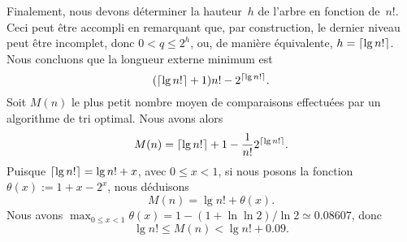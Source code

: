 Finalement, nous devons déterminer la hauteur~\(h\) de l'arbre en
fonction de~\(n!\). Ceci peut être accompli en remarquant que, par
construction, le dernier niveau peut être incomplet, donc \(0 < q
\leqslant 2^h\), ou, de manière équivalente, \(h = \lceil{\lg
  n!}\rceil\). Nous concluons que la longueur externe minimum est
\begin{equation*}
(\lceil{\lg n!}\rceil + 1) n! - 2^{\lceil{\lg n!}\rceil}.
\end{equation*}
Soit \(M(n)\) \label{def_Mn} le plus petit nombre moyen de
comparaisons effectuées par un algorithme de tri optimal. Nous avons
alors
\begin{equation*}
M(n) = \lceil{\lg n!}\rceil + 1 - \frac{1}{n!}2^{\lceil{\lg n!}\rceil}.
\end{equation*}
Puisque \(\lceil{\lg n!}\rceil = \lg n! + x\), avec \(0 \leqslant x < 1\),
si nous posons la fonction \(\theta(x) := 1 + x - 2^x\), nous
déduisons
\begin{equation*}
M(n) = \lg n! + \theta(x).
\end{equation*}
Nous avons \(\max_{0\leqslant x < 1}\theta(x) = 1 - (1 + \ln\ln
2)/\!\ln 2 \simeq 0.08607\), donc
\begin{equation}
\lg n! \leqslant M(n) < \lg n! + 0.09.
\label{ineq_Mn}
\end{equation}
